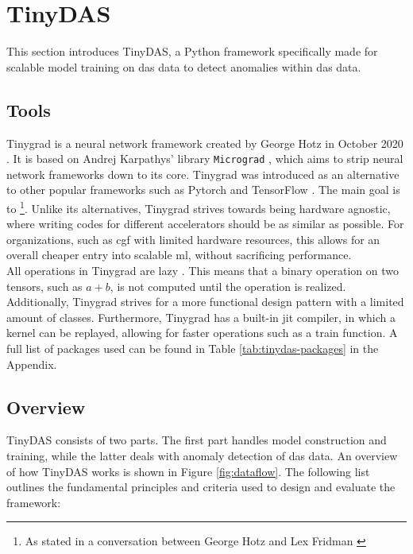 \section{TinyDAS}

This section introduces TinyDAS, a Python framework specifically made for scalable model training on \acrshort{das} data to detect anomalies within \acrshort{das} data. 

\subsection{Tools}

Tinygrad is a neural network framework created by George Hotz in October 2020 \cite{tinygrad2020}. It is based on Andrej Karpathys' library \texttt{Micrograd} \cite{micrograd}, which aims to strip neural network frameworks down to its core. Tinygrad was introduced as an alternative to other popular frameworks such as Pytorch \cite{paszke2019pytorch} and TensorFlow \cite{abadi2016tensorflow}. The main goal is to  \footnote{As stated in a conversation between George Hotz and Lex Fridman \cite{LexClipsYouTube2023}}. Unlike its alternatives, Tinygrad strives towards being hardware agnostic, where writing codes for different accelerators should be as similar as possible. For organizations, such as \acrshort{cgf} with limited hardware resources, this allows for an overall cheaper entry into scalable \acrshort{ml}, without sacrificing performance. \\

All operations in Tinygrad are lazy \cite{tinygrad}. This means that a binary operation on two tensors, such as $a+b$, is not computed until the operation is realized. Additionally, Tinygrad strives for a more functional design pattern with a limited amount of classes. Furthermore, Tinygrad has a built-in \acrfull{jit} compiler, in which a kernel can be replayed, allowing for faster operations such as a train function. A full list of packages used can be found in Table \ref{tab:tinydas-packages} in the Appendix.

\subsection{Overview}
\label{meth:tinyoverview}

TinyDAS consists of two parts. The first part handles model construction and training, while the latter deals with anomaly detection of \acrshort{das} data. An overview of how TinyDAS works is shown in Figure \ref{fig:dataflow}. The following list outlines the fundamental principles and criteria used to design and evaluate the framework:

